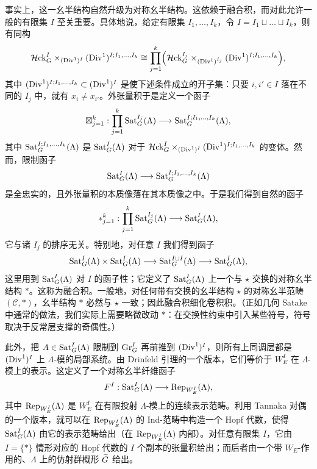 事实上，这一幺半结构自然升级为对称幺半结构。这依赖于融合积，而对此允许一般的有限集 $I$ 至关重要。具体地说，给定有限集 $I_1,\dots,I_k$，令 $I=I_1\sqcup\dots\sqcup I_k$，则有同构
\[
\mathcal{H}\mathrm{ck}^I_G\times_{(\mathrm{Div}^1)^I}(\mathrm{Div}^1)^{I;I_1,\dots,I_k}\cong\prod_{j=1}^{k}\Bigl(\mathcal{H}\mathrm{ck}^{I_j}_G\times_{(\mathrm{Div}^1)^{I_j}}(\mathrm{Div}^1)^{I;I_1,\dots,I_k}\Bigr),
\]
其中 $(\mathrm{Div}^1)^{I;I_1,\dots,I_k}\subset(\mathrm{Div}^1)^I$ 是使下述条件成立的开子集：只要 $i,i'\in I$ 落在不同的 $I_j$ 中，就有 $x_i\neq x_{i'}$。外张量积于是定义一个函子
\[
\boxtimes_{j=1}^{k}:\prod_{j=1}^{k}\operatorname{Sat}^{I_j}_G(\Lambda)\longrightarrow\operatorname{Sat}^{I;I_1,\dots,I_k}_G(\Lambda),
\]
其中 $\operatorname{Sat}^{I;I_1,\dots,I_k}_G(\Lambda)$ 是 $\operatorname{Sat}^I_G(\Lambda)$ 对于 $\mathcal{H}\mathrm{ck}^I_G\times_{(\mathrm{Div}^1)^I}(\mathrm{Div}^1)^{I;I_1,\dots,I_k}$ 的变体。然而，限制函子
\[
\operatorname{Sat}^I_G(\Lambda)\longrightarrow\operatorname{Sat}^{I;I_1,\dots,I_k}_G(\Lambda)
\]
是全忠实的，且外张量积的本质像落在其本质像之中。于是我们得到自然的函子
\[
\ast_{j=1}^{k}:\prod_{j=1}^{k}\operatorname{Sat}^{I_j}_G(\Lambda)\longrightarrow\operatorname{Sat}^{I}_G(\Lambda),
\]
它与诸 $I_j$ 的排序无关。特别地，对任意 $I$ 我们得到函子
\[
\operatorname{Sat}^I_G(\Lambda)\times\operatorname{Sat}^I_G(\Lambda)\longrightarrow\operatorname{Sat}^{I\sqcup I}_G(\Lambda)\longrightarrow\operatorname{Sat}^{I}_G(\Lambda),
\]
这里用到 $\operatorname{Sat}^I_G(\Lambda)$ 对 $I$ 的函子性；它定义了 $\operatorname{Sat}^I_G(\Lambda)$ 上一个与 $\star$ 交换的对称幺半结构 $\ast$。这称为融合积。一般地，对任何带有交换的幺半结构 $\star$ 的对称幺半范畴 $(\mathcal{C},\ast)$，幺半结构 $\ast$ 必然与 $\star$ 一致；因此融合积细化卷积积。（正如几何 Satake 中通常的做法，我们实际上需要略微改动 $\ast$：在交换性约束中引入某些符号，符号取决于反常层支撑的奇偶性。）



此外，把 $A\in\operatorname{Sat}^I_G(\Lambda)$ 限制到 $\mathrm{Gr}^I_G$ 再前推到 $(\mathrm{Div}^1)^I$，则所有上同调层都是 $(\mathrm{Div}^1)^I$ 上 $\Lambda$-模的局部系统。由 Drinfeld 引理的一个版本，它们等价于 $W_E^I$ 在 $\Lambda$-模上的表示。这定义了一个对称幺半纤维函子
\[
F^I:\operatorname{Sat}^I_G(\Lambda)\longrightarrow\mathrm{Rep}_{W_E^I}(\Lambda),
\]
其中 $\mathrm{Rep}_{W_E^I}(\Lambda)$ 是 $W_E^I$ 在有限投射 $\Lambda$-模上的连续表示范畴。利用 Tannaka 对偶的一个版本，就可以在 $\mathrm{Rep}_{W_E^I}(\Lambda)$ 的 Ind-范畴中构造一个 Hopf 代数，使得 $\operatorname{Sat}^I_G(\Lambda)$ 由它的表示范畴给出（在 $\mathrm{Rep}_{W_E^I}(\Lambda)$ 内部）。对任意有限集 $I$，它由 $I=\{*\}$ 情形对应的 Hopf 代数的 $I$ 个副本的张量积给出；而后者由一个带 $W_E$-作用的、$\Lambda$ 上的仿射群概形 $\widetilde{G}$ 给出。

